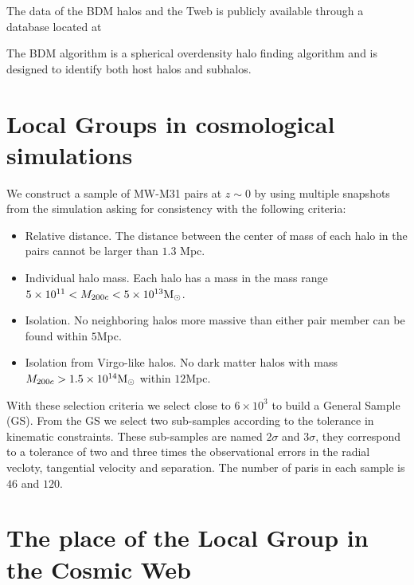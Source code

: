 \documentclass{iau}
\newcommand{\Msun}{{\ifmmode{{\rm {M_{\odot}}}}\else{${\rm{M_{\odot}}}$}\fi}}
\begin{document}
The data of the BDM halos and the Tweb is publicly available through
a database located at 



 The BDM algorithm is  a spherical
overdensity halo finding algorithm and is designed to identify both
host halos and subhalos. 






\section{Local Groups in cosmological simulations}
We construct a sample of MW-M31 pairs at $z\sim 0$ by using multiple
snapshots from the simulation asking for consistency with the
following criteria:

\begin{itemize}
\item Relative distance. The distance between the center of mass of
  each halo in the pairs cannot be larger than $1.3$ Mpc.
\item Individual halo mass. Each halo has a mass in the mass range
  $5\times 10^{11}<M_{200c}<5\times 10^{13}\Msun$.  
\item  Isolation. No neighboring halos more massive than either pair
member can be found within $5$Mpc.
\item Isolation from Virgo-like halos. No dark matter halos with mass
  $M_{200c}>1.5\times 10^{14}\Msun$ within $12$Mpc.
\end{itemize}

With these selection criteria we select close to $6\times 10^3$ to build
a General Sample (GS). From the GS we select two sub-samples
according to the tolerance in kinematic constraints. These sub-samples 
are named $2\sigma$ and $3\sigma$, they correspond to a tolerance of
two and three times the observational errors in the radial vecloty,
tangential velocity and separation. The number of paris in each sample
is $46$ and $120$.  

\section{The place of the Local Group in the Cosmic Web}
\end{document}
